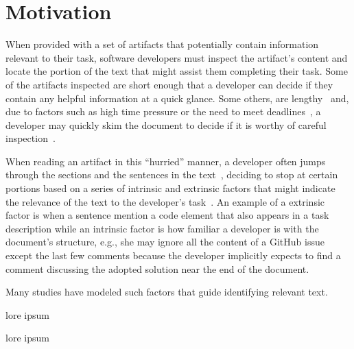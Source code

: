 \section{Motivation}
\label{cp5:motivation}


When provided with a set of artifacts that potentially contain information relevant to their task,
software developers must inspect the artifact's content and locate the portion of the text that might assist them completing their task. 
Some of the artifacts inspected are short enough that a developer can decide if they contain any helpful information at a quick glance.
Some others, are lengthy~\cite{Rastkar2013t} and, due to factors such as high time pressure or the need to meet deadlines~\cite{meyer2019}, a developer may quickly skim the document
to decide if it is worthy of careful inspection~\cite{Starke2009}.



When reading an artifact in this ``hurried'' manner, a developer often jumps through the sections and the sentences in the text~\cite{Brandt2009a, Starke2009},
deciding to stop at certain portions based on a series of intrinsic and extrinsic factors 
that might indicate the relevance of the text to the developer's task~\cite{Freund2015}.
An example of a extrinsic factor is when a sentence mention a code element that also appears in a task description while 
an intrinsic factor is how familiar a developer is with the document's structure, e.g., she may ignore all the content of a GitHub issue except 
the last few comments because the developer implicitly expects to find a comment discussing the adopted solution near the end of the document.





Many studies have modeled such factors that guide identifying relevant text.

lore ipsum





lore ipsum













